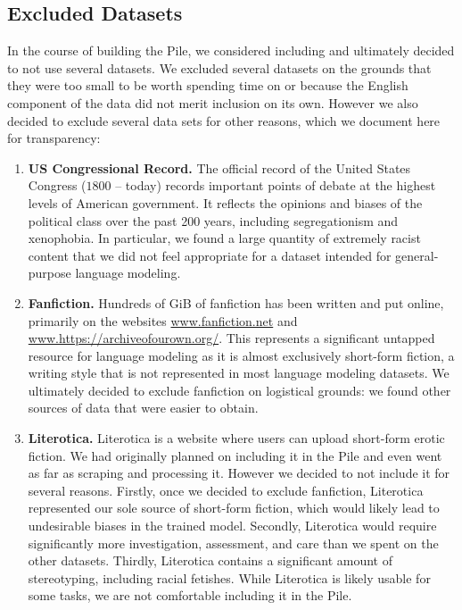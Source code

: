 \documentclass[11pt,a4paper]{article}
\begin{document}
\begin{appendices}
\section{Excluded Datasets}\label{apdx:excluded}

In the course of building the Pile, we considered including and ultimately decided to not use several datasets. We excluded several datasets on the grounds that they were too small to be worth spending time on or because the English component of the data did not merit inclusion on its own. However we also decided to exclude several data sets for other reasons, which we document here for transparency:

\begin{enumerate}
    \item \textbf{US Congressional Record.} The official record of the United States Congress ($1800$ -- today) records important points of debate at the highest levels of American government. It reflects the opinions and biases of the political class over the past 200 years, including segregationism and xenophobia. In particular, we found a large quantity of extremely racist content that we did not feel appropriate for a dataset intended for general-purpose language modeling.
    \item \textbf{Fanfiction.} Hundreds of GiB of fanfiction has been written and put online, primarily on the websites \url{www.fanfiction.net} and \url{www.https://archiveofourown.org/}. This represents a significant untapped resource for language modeling as it is almost exclusively short-form fiction, a writing style that is not represented in most language modeling datasets. We ultimately decided to exclude fanfiction on logistical grounds: we found other sources of data that were easier to obtain.
    \item \textbf{Literotica.} Literotica is a website where users can upload short-form erotic fiction. We had originally planned on including it in the Pile and even went as far as scraping and processing it. However we decided to not include it for several reasons. Firstly, once we decided to exclude fanfiction, Literotica represented our sole source of short-form fiction, which would likely lead to undesirable biases in the trained model. Secondly, Literotica would require significantly more investigation, assessment, and care than we spent on the other datasets. Thirdly, Literotica contains a significant amount of stereotyping, including racial fetishes. While Literotica is likely usable for some tasks, we are not comfortable including it in the Pile.
\end{enumerate}


\end{appendices}
\end{document}
